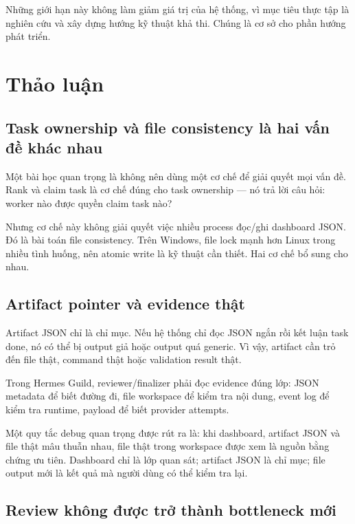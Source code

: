 \documentclass[12pt,a4paper]{article}
\begin{document}
Những giới hạn này không làm giảm giá trị của hệ thống, vì mục tiêu thực tập là nghiên cứu và xây dựng hướng kỹ thuật khả thi. Chúng là cơ sở cho phần hướng phát triển.

\section{Thảo luận}

\subsection{Task ownership và file consistency là hai vấn đề khác nhau}

Một bài học quan trọng là không nên dùng một cơ chế để giải quyết mọi vấn đề. Rank và claim task là cơ chế đúng cho task ownership — nó trả lời câu hỏi: worker nào được quyền claim task nào?

Nhưng cơ chế này không giải quyết việc nhiều process đọc/ghi dashboard JSON. Đó là bài toán file consistency. Trên Windows, file lock mạnh hơn Linux trong nhiều tình huống, nên atomic write là kỹ thuật cần thiết. Hai cơ chế bổ sung cho nhau.

\subsection{Artifact pointer và evidence thật}

Artifact JSON chỉ là chỉ mục. Nếu hệ thống chỉ đọc JSON ngắn rồi kết luận task done, nó có thể bị output giả hoặc output quá generic. Vì vậy, artifact cần trỏ đến file thật, command thật hoặc validation result thật.

Trong Hermes Guild, reviewer/finalizer phải đọc evidence đúng lớp: JSON metadata để biết đường đi, file workspace để kiểm tra nội dung, event log để kiểm tra runtime, payload để biết provider attempts.

Một quy tắc debug quan trọng được rút ra là: khi dashboard, artifact JSON và file thật mâu thuẫn nhau, file thật trong workspace được xem là nguồn bằng chứng ưu tiên. Dashboard chỉ là lớp quan sát; artifact JSON là chỉ mục; file output mới là kết quả mà người dùng có thể kiểm tra lại.

\subsection{Review không được trở thành bottleneck mới}
\end{document}
